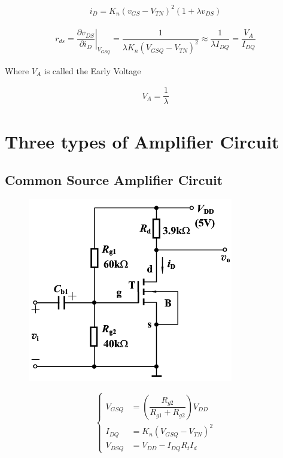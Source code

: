 \begin{equation*}
  \begin{aligned}
    i_D = K_n \left( v_{GS} - V_{TN} \right)^2 \left( 1 + \lambda v_{DS} \right)
  \end{aligned}
\end{equation*}

\begin{equation*}
  \begin{aligned}
    r_{ds} = \left. \dfrac{\partial v_{DS}}{\partial i_D} \right|_{V_{GSQ}} = \dfrac{1}{\lambda K_n \left( V_{GSQ} - V_{TN} \right)^2} \approx \dfrac{1}{\lambda I_{DQ}} = \dfrac{V_A}{I_{DQ}}   
  \end{aligned}
\end{equation*}

Where $V_A$ is called the Early Voltage

\begin{equation*}
  \begin{aligned}
    V_A = \dfrac{1}{\lambda} 
  \end{aligned}
\end{equation*}

\section{Three types of Amplifier Circuit}

\subsection{Common Source Amplifier Circuit}

\begin{figure}[H]
  \centering
  \includegraphics[width=0.5\linewidth]{figures/MOSFET-Common-S}
  \label{fig:}
\end{figure}

\begin{equation*}
  \left\{
  \begin{aligned}
    V_{GSQ} &= \left( \dfrac{R_{g2}}{R_{g1} + R_{g2}}  \right) V_{DD} \\
    I_{DQ} &= K_n \left( V_{GSQ} - V_{TN} \right)^2 \\
    V_{DSQ} &= V_{DD} - I_{DQ} R_tI_d
  \end{aligned}
  \right.
\end{equation*}


